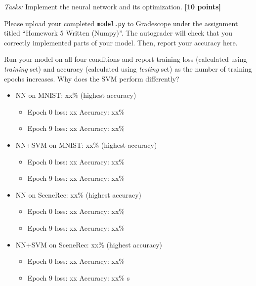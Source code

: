 \begin{tcolorbox}[colback=orange!5!white,colframe=orange!75!black]
\emph{Tasks:} Implement the neural network and its optimization. \textbf{[10 points]}

\vspace{1em}
Please upload your completed \texttt{model.py} to Gradescope under the assignment titled ``Homework 5 Written (Numpy)''. The autograder will check that you correctly implemented parts of your model. Then, report your accuracy here.
\end{tcolorbox}

\begin{tcolorbox}[colback=orange!5!white,colframe=orange!75!black]
Run your model on all four conditions and report training loss (calculated using \emph{training} set) and accuracy (calculated using \emph{testing} set) as the number of training epochs increases. Why does the SVM perform differently?
\end{tcolorbox}
\begin{tcolorbox}[colback=white!5!white,colframe=green!75!black]
    \begin{itemize}
        \item NN on MNIST: xx\% (highest accuracy)
            \begin{itemize}
            \item Epoch 0 loss: xx     Accuracy: xx\%
            \item Epoch 9 loss: xx     Accuracy: xx\%
            \end{itemize}
        \item NN+SVM on MNIST: xx\% (highest accuracy)
            \begin{itemize}
            \item Epoch 0 loss: xx     Accuracy: xx\%
            \item Epoch 9 loss: xx     Accuracy: xx\%
            \end{itemize}
        \item NN on SceneRec: xx\% (highest accuracy)
            \begin{itemize}
            \item Epoch 0 loss: xx     Accuracy: xx\%
            \item Epoch 9 loss: xx     Accuracy: xx\%
            \end{itemize}
        \item NN+SVM on SceneRec: xx\% (highest accuracy)
            \begin{itemize}
            \item Epoch 0 loss: xx     Accuracy: xx\%
            \item Epoch 9 loss: xx     Accuracy: xx\%
            s\end{itemize}
    \end{itemize}
\end{tcolorbox}


